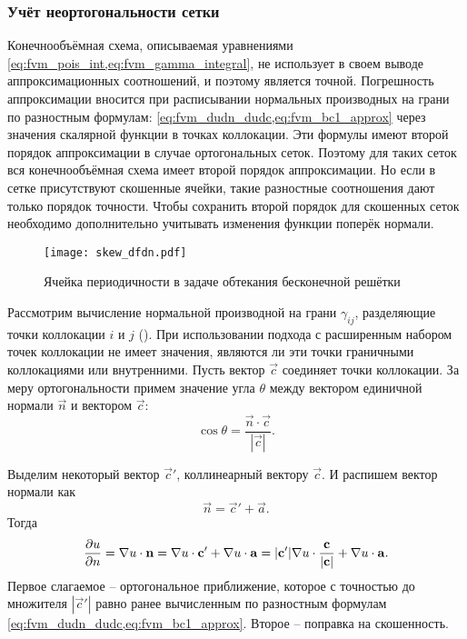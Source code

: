 \subsubsection{Учёт неортогональности сетки}
\label{sec:nonortho_fvm}
Конечнообъёмная схема, описываемая уравнениями \cref{eq:fvm_pois_int,eq:fvm_gamma_integral},
не использует в своем выводе аппроксимационных соотношений, и поэтому является точной.
Погрешность аппроксимации вносится при расписывании нормальных производных на грани
по разностным формулам: \cref{eq:fvm_dudn_dudc,eq:fvm_bc1_approx} через значения скалярной функции в точках коллокации.
Эти формулы имеют второй порядок аппроксимации в случае
ортогональных сеток. Поэтому для таких сеток
вся конечнообъёмная схема имеет второй порядок аппроксимации.
Но если в сетке присутствуют скошенные ячейки,
такие разностные соотношения дают только порядок точности.
Чтобы сохранить второй порядок для скошенных сеток необходимо 
дополнительно учитывать изменения функции поперёк нормали.

\begin{figure}[h!]
\centering
\texttt{[image: skew\_dfdn.pdf]}
\caption{Ячейка периодичности в задаче обтекания бесконечной решётки}
\label{fig:skew_dfdn}
\end{figure}
Рассмотрим вычисление нормальной производной на грани $\gamma_{ij}$,
разделяющие точки коллокации $i$ и $j$ ().
При использовании подхода с расширенным набором точек коллокации
не имеет значения, являются ли эти точки граничными коллокациями или внутренними.
Пусть вектор $\vec c$ соединяет точки коллокации.
За меру ортогональности примем значение угла $\theta$ 
между вектором единичной нормали $\vec n$ и вектором $\vec c$:
\begin{equation*}
\cos\theta = \frac{\vec n \cdot \vec c}{|\vec c|}.
\end{equation*}

Выделим некоторый вектор $\vec c'$, коллинеарный вектору $\vec c$.
И распишем вектор нормали как 
\begin{equation}
\label{eq:n_cprime_a}
\vec n = \vec c' + \vec a.
\end{equation}
Тогда
\begin{equation}
\label{eq:dudn_decomp}
\frac{\partial u}{\partial n} = \nabla u \cdot \boldsymbol{\rm n} = \nabla u \cdot \boldsymbol{\rm c}' + \nabla u \cdot \boldsymbol{\rm a}
= |\boldsymbol{\rm c}'| \nabla u \cdot \frac{\boldsymbol{\rm c}}{|\boldsymbol{\rm c}|} + \nabla u \cdot \boldsymbol{\rm a}.
\end{equation}
Первое слагаемое -- ортогональное приближение, которое 
с точностью до множителя $|\vec c'|$ равно ранее вычисленным
по разностным формулам \cref{eq:fvm_dudn_dudc,eq:fvm_bc1_approx}.
Второе -- поправка на скошенность.

